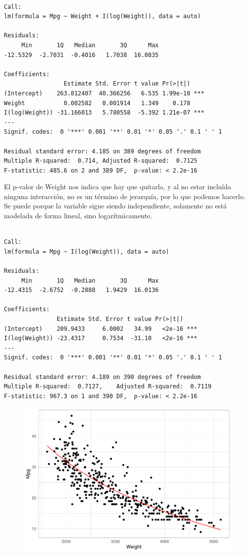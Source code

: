 \begin{verbatim}

Call:
lm(formula = Mpg ~ Weight + I(log(Weight)), data = auto)

Residuals:
     Min       1Q   Median       3Q      Max 
-12.5329  -2.7031  -0.4016   1.7038  16.0835 

Coefficients:
                 Estimate Std. Error t value Pr(>|t|)    
(Intercept)    263.812407  40.366256   6.535 1.99e-10 ***
Weight           0.002582   0.001914   1.349    0.178    
I(log(Weight)) -31.166013   5.780558  -5.392 1.21e-07 ***
---
Signif. codes:  0 '***' 0.001 '**' 0.01 '*' 0.05 '.' 0.1 ' ' 1

Residual standard error: 4.185 on 389 degrees of freedom
Multiple R-squared:  0.714, Adjusted R-squared:  0.7125 
F-statistic: 485.6 on 2 and 389 DF,  p-value: < 2.2e-16
\end{verbatim}

El p-valor de Weight nos indica que hay que quitarla, y al no estar incluída ninguna interacción, no es un término de jerarquía, por lo que podemos hacerlo. Se puede porque la variable sigue siendo independiente, solamente no está modelada de forma lineal, sino logarítmicamente.

\begin{verbatim}

Call:
lm(formula = Mpg ~ I(log(Weight)), data = auto)

Residuals:
     Min       1Q   Median       3Q      Max 
-12.4315  -2.6752  -0.2888   1.9429  16.0136 

Coefficients:
               Estimate Std. Error t value Pr(>|t|)    
(Intercept)    209.9433     6.0002   34.99   <2e-16 ***
I(log(Weight)) -23.4317     0.7534  -31.10   <2e-16 ***
---
Signif. codes:  0 '***' 0.001 '**' 0.01 '*' 0.05 '.' 0.1 ' ' 1

Residual standard error: 4.189 on 390 degrees of freedom
Multiple R-squared:  0.7127,    Adjusted R-squared:  0.7119 
F-statistic: 967.3 on 1 and 390 DF,  p-value: < 2.2e-16
\end{verbatim}

\begin{figure}[H]\includegraphics[width=.9\linewidth]{img/Regresion_files/figure-latex/unnamed-chunk-24-1} \caption{}\end{figure}

